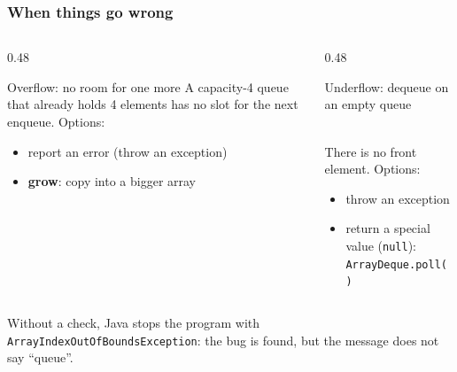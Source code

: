 \documentclass[aspectratio=169,10pt,compress]{beamer}
\begin{document}
\begin{frame}[t,fragile] \frametitle{When things go wrong}
  \begin{columns}[T]
    \begin{column}{0.48\textwidth}
      \begin{block}{Overflow: no room for one more}
        \small A capacity-4 queue that already holds 4 elements has no slot for the next enqueue. Options:
        \begin{itemize}\small
          \item report an error (throw an exception)
          \item \textbf{grow}: copy into a bigger array
        \end{itemize}
      \end{block}
    \end{column}
    \begin{column}{0.48\textwidth}
      \begin{block}{Underflow: dequeue on an empty queue}
        \\[0.2em]
        \small There is no front element. Options:
        \begin{itemize}\small
          \item throw an exception
          \item return a special value (\texttt{null}): \texttt{ArrayDeque.poll()}
        \end{itemize}
      \end{block}
    \end{column}
  \end{columns}
  \vspace{0.3em}
  \small Without a check, Java stops the program with \texttt{ArrayIndexOutOfBoundsException}: the bug is found, but the message does not say ``queue''.
\end{frame}

\end{document}
